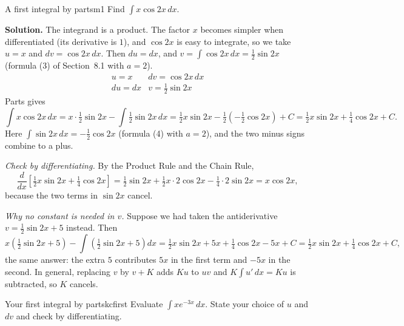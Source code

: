 \documentclass[11pt]{article}
\begin{document}
\begin{exmp}{A first integral by parts}{m1}
Find $\int x\cos2x\,dx$.

\textbf{Solution.} The integrand is a product. The factor $x$ becomes simpler when differentiated (its derivative is $1$), and $\cos2x$ is easy to integrate, so we take $u=x$ and $dv=\cos2x\,dx$. Then $du=dx$, and $v=\int\cos2x\,dx=\frac12\sin2x$ (formula (3) of Section~8.1 with $a=2$).
\[\begin{array}{ll}u=x&dv=\cos2x\,dx\\[2pt]du=dx&v=\tfrac12\sin2x\end{array}\]
Parts gives
\[\int x\cos2x\,dx=x\cdot\tfrac12\sin2x-\int\tfrac12\sin2x\,dx=\tfrac12x\sin2x-\tfrac12\left(-\tfrac12\cos2x\right)+C=\tfrac12x\sin2x+\tfrac14\cos2x+C .\]
Here $\int\sin2x\,dx=-\frac12\cos2x$ (formula (4) with $a=2$), and the two minus signs combine to a plus.

\emph{Check by differentiating.} By the Product Rule and the Chain Rule,
\[\frac{d}{dx}\left[\tfrac12x\sin2x+\tfrac14\cos2x\right]=\tfrac12\sin2x+\tfrac12x\cdot2\cos2x-\tfrac14\cdot2\sin2x=x\cos2x,\]
because the two terms in $\sin2x$ cancel.

\emph{Why no constant is needed in $v$.} Suppose we had taken the antiderivative $v=\frac12\sin2x+5$ instead. Then
\[x\left(\tfrac12\sin2x+5\right)-\int\left(\tfrac12\sin2x+5\right)dx=\tfrac12x\sin2x+5x+\tfrac14\cos2x-5x+C=\tfrac12x\sin2x+\tfrac14\cos2x+C,\]
the same answer: the extra $5$ contributes $5x$ in the first term and $-5x$ in the second. In general, replacing $v$ by $v+K$ adds $Ku$ to $uv$ and $K\int u'\,dx=Ku$ is subtracted, so $K$ cancels.
\end{exmp}

\begin{kc}{Your first integral by parts}{kcfirst}
Evaluate $\int xe^{-3x}\,dx$. State your choice of $u$ and $dv$ and check by differentiating.
\end{kc}
\end{document}
